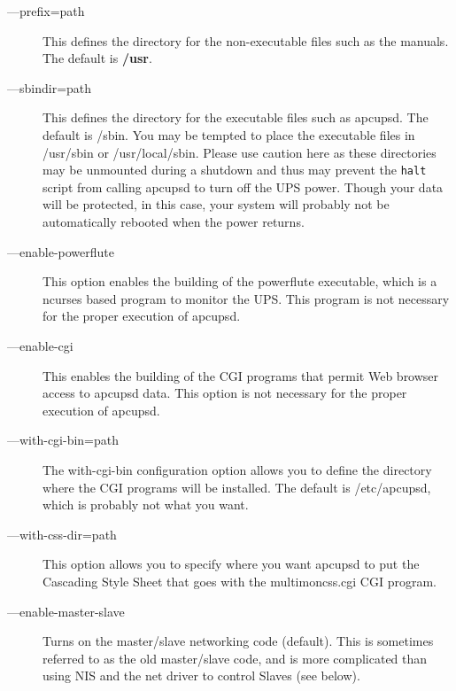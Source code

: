 \begin{description}

\item [{---}prefix=\lt{}path\gt{}]
   This defines the directory for the non-executable files such as the manuals.
The default is {\bf /usr}.  

\label{index-options_002c-_002d_002d_002dsbindir-27}

\item [{---}sbindir=\lt{}path\gt{}]
   This defines the directory for the executable files such as apcupsd. The
default is /sbin. You may be tempted to place the executable files in
/usr/sbin or /usr/local/sbin. Please use caution here as these directories may
be unmounted during a shutdown and thus may prevent the {\tt halt} script from
calling apcupsd to turn off the UPS power. Though your data will be protected,
in this case, your system will probably not be automatically rebooted when the
power returns.  

\label{index-options_002c-_002d_002d_002denable_002dpowerflute-28}

\item [{---}enable-powerflute]
   This option enables the building of the powerflute executable, which is a
ncurses based program to monitor the UPS. This program is not necessary for
the proper execution of apcupsd.  

\label{index-options_002c-_002d_002d_002denable_002dcgi-29}

\item [{---}enable-cgi]
   This enables the building of the CGI programs that permit Web browser access
to apcupsd data. This option is not necessary for the proper execution of
apcupsd.  

\item [{---}with-cgi-bin=\lt{}path\gt{}]
   The with-cgi-bin configuration option allows you to define the directory where
the CGI programs will be installed. The default is /etc/apcupsd, which is
probably not what you want.  

\item [{---}with-css-dir=\lt{}path\gt{}]
   This option allows you to specify where you want apcupsd to put the Cascading
Style Sheet that goes with the multimoncss.cgi CGI program.  

\item [{---}enable-master-slave]
   Turns on the master/slave networking code (default). This is sometimes
referred to as the old master/slave code, and is more complicated than using
NIS and the net driver to control Slaves (see below).  


\end{description}
